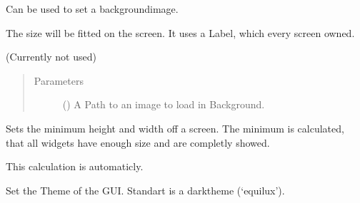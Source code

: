 \documentclass[letterpaper,10pt,english]{sphinxmanual}
\begin{document}
\begin{fulllineitems}

\begin{fulllineitems}
\label{\detokenize{anoog.automation:anoog.automation.graphical_user_interface.GUI_App.set_bg}}
\sphinxAtStartPar
Can be used to set a background\sphinxhyphen{}image.

\sphinxAtStartPar
The size will be fitted on the screen. It uses a Label, which every screen owned.

\sphinxAtStartPar
(Currently not used)
\begin{quote}\begin{description}
\item[{Parameters}] \leavevmode
\sphinxAtStartPar
{} () \textendash{} A Path to an image to load in Background.

\end{description}\end{quote}

\end{fulllineitems}


\begin{fulllineitems}
\label{\detokenize{anoog.automation:anoog.automation.graphical_user_interface.GUI_App.set_min}}
\sphinxAtStartPar
Sets the minimum height and width off a screen.
The minimum is calculated, that all widgets have enough size and are completly showed.

\sphinxAtStartPar
This calculation is automaticly.

\end{fulllineitems}


\begin{fulllineitems}
\label{\detokenize{anoog.automation:anoog.automation.graphical_user_interface.GUI_App.set_theme}}
\sphinxAtStartPar
Set the Theme of the GUI. Standart is a dark\sphinxhyphen{}theme (‘equilux’).


\end{fulllineitems}
\end{fulllineitems}
\end{document}
